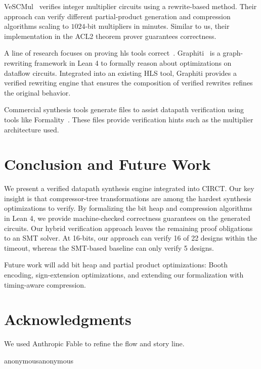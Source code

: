 \documentclass[conference]{IEEEtran}
\def\acmversionanonymous{anonymous}
\def\acmversion{anonymous}
\theoremstyle{plain}
\theoremstyle{definition}
\begin{document}
VeSCMul~\cite{mertcan_acl2multipliers,vescmul_acl2} verifies integer multiplier circuits using a rewrite-based method. 
Their approach can verify different partial-product generation and compression algorithms scaling to $1024$-bit multipliers in minutes. 
Similar to us, their implementation in the ACL2 theorem prover guarantees correctness.

A line of research focuses on proving \ac{hls} tools correct~\cite{herklotz2021formal,herklotz2024hyperblock}. 
Graphiti~\cite{graphiti} is a graph-rewriting framework in Lean 4 to formally reason about optimizations on dataflow circuits.
Integrated into an existing HLS tool, Graphiti provides a verified rewriting engine that ensures the composition of verified rewrites refines the original behavior.

Commercial synthesis tools generate files to assist datapath verification using tools like Formality~\cite{synopsys_formality}.
These files provide verification hints such as the multiplier architecture used.

\section{Conclusion and Future Work}
We present a verified datapath synthesis engine integrated into CIRCT.
Our key insight is that compressor-tree transformations are among the hardest synthesis optimizations to verify.
By formalizing the bit heap and compression algorithms in Lean 4,
we provide machine-checked correctness guarantees on the generated circuits.
Our hybrid verification approach leaves the remaining proof obligations to an SMT solver.
At 16-bits, our approach can verify 16 of 22 designs within the timeout,
whereas the SMT-based baseline can only verify 5 designs.

Future work will add bit heap and partial product optimizations:
Booth encoding, sign-extension optimizations, and extending our formalization
with timing-aware compression.

\section{Acknowledgments}
We used Anthropic Fable to refine the flow and story line.

\ifx\acmversion\acmversionanonymous
\else
\fi


\end{document}
